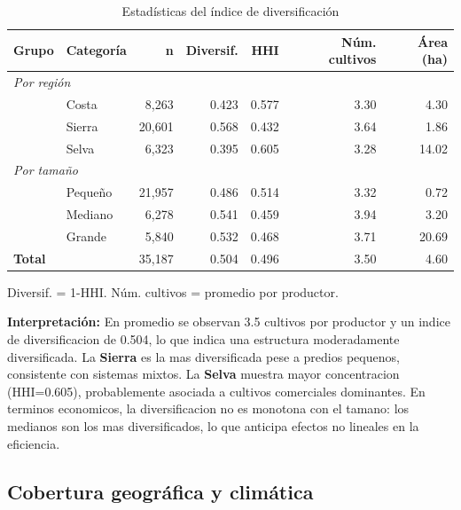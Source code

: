 \documentclass[10pt,a4paper]{article}
\begin{document}
\begin{table}[H]
\centering
\caption{Estadísticas del índice de diversificación}
\label{tab:diversif_detail}
\begin{threeparttable}
\small
\begin{tabular}{llrrrrr}
\toprule
\textbf{Grupo} & \textbf{Categoría} & \textbf{n} & \textbf{Diversif.} & \textbf{HHI} & \textbf{Núm. cultivos} & \textbf{Área (ha)} \\
\midrule
\multicolumn{7}{l}{\textit{Por región}} \\
& Costa & 8,263 & 0.423 & 0.577 & 3.30 & 4.30 \\
& Sierra & 20,601 & 0.568 & 0.432 & 3.64 & 1.86 \\
& Selva & 6,323 & 0.395 & 0.605 & 3.28 & 14.02 \\
\midrule
\multicolumn{7}{l}{\textit{Por tamaño}} \\
& Pequeño & 21,957 & 0.486 & 0.514 & 3.32 & 0.72 \\
& Mediano & 6,278 & 0.541 & 0.459 & 3.94 & 3.20 \\
& Grande & 5,840 & 0.532 & 0.468 & 3.71 & 20.69 \\
\midrule
\textbf{Total} & & 35,187 & 0.504 & 0.496 & 3.50 & 4.60 \\
\bottomrule
\end{tabular}
\begin{tablenotes}
\footnotesize
\item Diversif. = 1-HHI. Núm. cultivos = promedio por productor.
\end{tablenotes}
\end{threeparttable}
\end{table}

\textbf{Interpretación:} En promedio se observan 3.5 cultivos por productor y un indice de diversificacion de 0.504, lo que indica una estructura moderadamente diversificada. La \textbf{Sierra} es la mas diversificada pese a predios pequenos, consistente con sistemas mixtos. La \textbf{Selva} muestra mayor concentracion (HHI=0.605), probablemente asociada a cultivos comerciales dominantes. En terminos economicos, la diversificacion no es monotona con el tamano: los medianos son los mas diversificados, lo que anticipa efectos no lineales en la eficiencia.

\subsection{Cobertura geográfica y climática}
\end{document}
